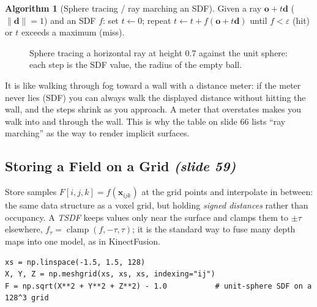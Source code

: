 \documentclass[11pt,a4paper]{article}
\newcommand{\vx}{\bm{x}}
\newcommand{\vo}{\bm{o}}
\newcommand{\vd}{\bm{d}}
\newcommand{\norm}[1]{\lVert #1\rVert}
\DeclareMathOperator{\clamp}{clamp}
\theoremstyle{definition}
\newtheorem{algorithm}[definition]{Algorithm}
\theoremstyle{plain}
\theoremstyle{remark}
\newcommand{\slides}[1]{\texorpdfstring{\emph{(#1)}}{(#1)}}
\begin{document}
\begin{algorithm}[Sphere tracing / ray marching an SDF]
Given a ray $\vo+t\vd$ ($\norm{\vd}=1$) and an SDF $f$: set $t\leftarrow0$; repeat $t\leftarrow t+f(\vo+t\vd)$ until $f<\varepsilon$ (hit) or $t$ exceeds a maximum (miss).
\end{algorithm}

\begin{figure}[ht]
\centering
{}
\caption{Sphere tracing a horizontal ray at height $0.7$ against the unit sphere: each step is the SDF value, the radius of the empty ball.}
\end{figure}

\begin{intuition}
It is like walking through fog toward a wall with a distance meter: if the meter never lies (SDF) you can always walk the displayed distance without hitting the wall, and the steps shrink as you approach. A meter that overstates makes you walk into and through the wall. This is why the table on slide 66 lists ``ray marching'' as the way to render implicit surfaces.
\end{intuition}

\subsection{Storing a Field on a Grid \slides{slide 59}}
Store samples $F[i,j,k]=f(\vx_{ijk})$ at the grid points and interpolate in between: the same data structure as a voxel grid, but holding \emph{signed distances} rather than occupancy. A \emph{TSDF} keeps values only near the surface and clamps them to $\pm\tau$ elsewhere, $f_\tau=\clamp(f,-\tau,\tau)$; it is the standard way to fuse many depth maps into one model, as in KinectFusion.
\begin{lstlisting}
xs = np.linspace(-1.5, 1.5, 128)
X, Y, Z = np.meshgrid(xs, xs, xs, indexing="ij")
F = np.sqrt(X**2 + Y**2 + Z**2) - 1.0           # unit-sphere SDF on a 128^3 grid
\end{lstlisting}
\end{document}

